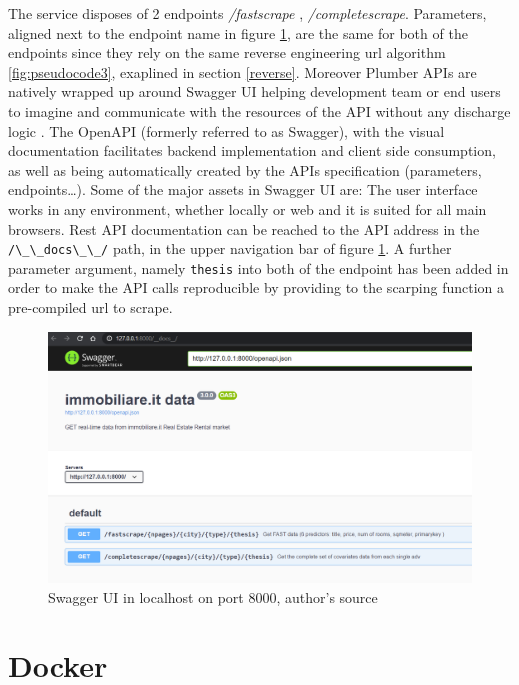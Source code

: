 \documentclass[
  12pt,
  a4paper,
  oneside]{book}
\newcommand{\passthrough}[1]{#1}
\theoremstyle{definition}
\theoremstyle{definition}
\theoremstyle{definition}
\theoremstyle{remark}
\begin{document}
The service disposes of 2 endpoints \emph{/fastscrape} , \emph{/completescrape}. Parameters, aligned next to the endpoint name in figure \ref{fig:swagger}, are the same for both of the endpoints since they rely on the same reverse engineering url algorithm \ref{fig:pseudocode3}, exaplined in section \ref{reverse}. Moreover Plumber APIs are natively wrapped up around Swagger UI helping development team or end users to imagine and communicate with the resources of the API without any discharge logic \citep{swaggerUI}. The OpenAPI (formerly referred to as Swagger), with the visual documentation facilitates backend implementation and client side consumption, as well as being automatically created by the APIs specification (parameters, endpoints\ldots). Some of the major assets in Swagger UI are: The user interface works in any environment, whether locally or web and it is suited for all main browsers.
Rest API documentation can be reached to the API address in the \passthrough{\lstinline!/\_\_docs\_\_/!} path, in the upper navigation bar of figure \ref{fig:swagger}. A further parameter argument, namely \passthrough{\lstinline!thesis!} into both of the endpoint has been added in order to make the API calls reproducible by providing to the scarping function a pre-compiled url to scrape.

\begin{figure}
\centering
\includegraphics{images/swagger.PNG}
\caption{\label{fig:swagger}Swagger UI in localhost on port 8000, author's source}
\end{figure}

\hypertarget{docker}{%
\section{Docker}\label{docker}}
\end{document}
